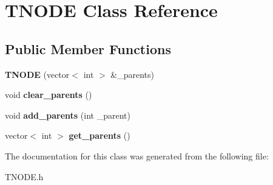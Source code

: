 \hypertarget{class_t_n_o_d_e}{}\section{T\+N\+O\+DE Class Reference}
\label{class_t_n_o_d_e}
\subsection*{Public Member Functions}
\begin{DoxyCompactItemize}
\item 
\mbox{\label{class_t_n_o_d_e_a73e4dd8b452a8dd3dfe392c7eed8d5dd}} 
{\bfseries T\+N\+O\+DE} (vector$<$ int $>$ \&\+\_\+parents)
\item 
\mbox{\label{class_t_n_o_d_e_a9bebd75e7fb98753cedef7e2c0f5d4cf}} 
void {\bfseries clear\+\_\+parents} ()
\item 
\mbox{\label{class_t_n_o_d_e_a8e882586c310ca926c19980d6172e50e}} 
void {\bfseries add\+\_\+parents} (int \+\_\+parent)
\item 
\mbox{\label{class_t_n_o_d_e_a137b9ed765171223df14d9d13c5041b2}} 
vector$<$ int $>$ {\bfseries get\+\_\+parents} ()
\end{DoxyCompactItemize}


The documentation for this class was generated from the following file\+:\begin{DoxyCompactItemize}
\item 
T\+N\+O\+D\+E.\+h\end{DoxyCompactItemize}
